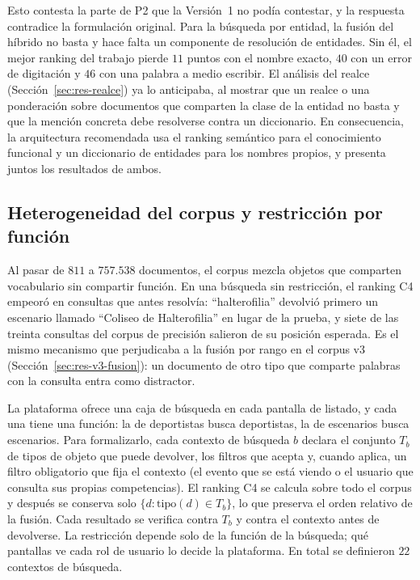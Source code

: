 \documentclass[11pt,letterpaper]{article}
\numberwithin{equation}{section}
\begin{document}
Esto contesta la parte de P2 que la Versión~1 no podía contestar, y la respuesta contradice la formulación original. Para la búsqueda por entidad, la fusión del híbrido no basta y hace falta un componente de resolución de entidades. Sin él, el mejor ranking del trabajo pierde $11$ puntos con el nombre exacto, $40$ con un error de digitación y $46$ con una palabra a medio escribir. El análisis del realce (Sección~\ref{sec:res-realce}) ya lo anticipaba, al mostrar que un realce o una ponderación sobre documentos que comparten la clase de la entidad no basta y que la mención concreta debe resolverse contra un diccionario. En consecuencia, la arquitectura recomendada usa el ranking semántico para el conocimiento funcional y un diccionario de entidades para los nombres propios, y presenta juntos los resultados de ambos.

\subsection{Heterogeneidad del corpus y restricción por función}
\label{sec:res-funcion}
Al pasar de $811$ a $757.538$ documentos, el corpus mezcla objetos que comparten vocabulario sin compartir función. En una búsqueda sin restricción, el ranking C4 empeoró en consultas que antes resolvía: ``halterofilia'' devolvió primero un escenario llamado ``Coliseo de Halterofilia'' en lugar de la prueba, y siete de las treinta consultas del corpus de precisión salieron de su posición esperada. Es el mismo mecanismo que perjudicaba a la fusión por rango en el corpus v3 (Sección~\ref{sec:res-v3-fusion}): un documento de otro tipo que comparte palabras con la consulta entra como distractor.

La plataforma ofrece una caja de búsqueda en cada pantalla de listado, y cada una tiene una función: la de deportistas busca deportistas, la de escenarios busca escenarios. Para formalizarlo, cada contexto de búsqueda $b$ declara el conjunto $T_b$ de tipos de objeto que puede devolver, los filtros que acepta y, cuando aplica, un filtro obligatorio que fija el contexto (el evento que se está viendo o el usuario que consulta sus propias competencias). El ranking C4 se calcula sobre todo el corpus y después se conserva solo $\{d : \mathrm{tipo}(d)\in T_b\}$, lo que preserva el orden relativo de la fusión. Cada resultado se verifica contra $T_b$ y contra el contexto antes de devolverse. La restricción depende solo de la función de la búsqueda; qué pantallas ve cada rol de usuario lo decide la plataforma. En total se definieron $22$ contextos de búsqueda.
\end{document}
